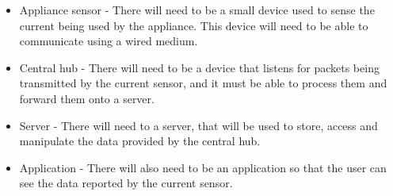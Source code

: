 \documentclass[draft,preprint,12pt,3p]{elsarticle}
\begin{document}
\begin{itemize}
\item Appliance sensor - There will need to be a small device used to sense the current being used by the appliance. This device will need to be able to communicate using a wired medium.
\item Central hub - There will need to be a device that listens for packets being transmitted by the current sensor, and it must be able to process them and forward them onto a server.
\item Server - There will need to a server, that will be used to store, access and manipulate the data provided by the central hub.
\item Application - There will also need to be an application so that the user can see the data reported by the current sensor.
\end{itemize}
\end{document}
